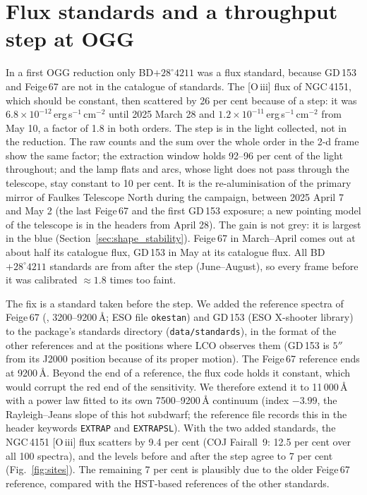 \section{Flux standards and a throughput step at OGG}
\label{sec:sites_flux}
In a first OGG reduction only BD$+28^\circ4211$ was a flux standard, because GD\,153 and Feige\,67 are not in the
\banzai{} catalogue of standards. The [O\,{\sc iii}] flux of NGC\,4151, which should be constant, then scattered by
26 per cent because of a step: it was $6.8\times10^{-12}$\,erg\,s$^{-1}$\,cm$^{-2}$ until 2025 March 28 and
$1.2\times10^{-11}$\,erg\,s$^{-1}$\,cm$^{-2}$ from May 10, a factor of 1.8 in both orders. The step is in the light
collected, not in the reduction. The raw counts and the sum over the whole order in the 2-d frame show the same factor;
the extraction window holds 92--96 per cent of the light throughout; and the lamp flats and arcs, whose light does
not pass through the telescope, stay constant to 10 per cent. It is the re-aluminisation of the primary mirror of
Faulkes Telescope North during the campaign, between 2025 April 7 and May 2 (the last Feige\,67 and the first
GD\,153 exposure; a new pointing model of the telescope is in the headers from April 28). The gain is not grey: it is
largest in the blue (Section~\ref{sec:shape_stability}). Feige\,67 in March--April comes
out at about half its catalogue flux, GD\,153 in May at its catalogue flux. All BD$+28^\circ4211$ standards are from after the
step (June--August), so every frame before it was calibrated $\approx1.8$ times too faint.

The fix is a standard taken before the step. We added the reference spectra of Feige\,67 (\citealt{Oke1990},
3200--9200\,\AA; ESO file \texttt{okestan}) and GD\,153 (ESO X-shooter library) to the package's standards directory
(\texttt{data/standards}), in the format of the other references and at the positions where LCO observes them
(GD\,153 is $5''$ from its J2000 position because of its proper motion). The Feige\,67 reference ends at 9200\,\AA.
Beyond the end of a reference, the flux code holds it constant, which would corrupt the red end of the sensitivity. We
therefore extend it to 11\,000\,\AA{} with a power law fitted to its own 7500--9200\,\AA{} continuum (index $-3.99$,
the Rayleigh--Jeans slope of this hot subdwarf; the reference file records this in the header keywords
\texttt{EXTRAP} and \texttt{EXTRAPSL}). With the two added standards, the NGC\,4151 [O\,{\sc iii}] flux scatters by
9.4 per cent (COJ Fairall~9: 12.5 per cent over all 100 spectra), and the levels before and after the step agree to
7 per cent (Fig.~\ref{fig:sites}). The remaining 7 per cent is plausibly due to the older Feige\,67 reference, compared
with the HST-based references of the other standards.

